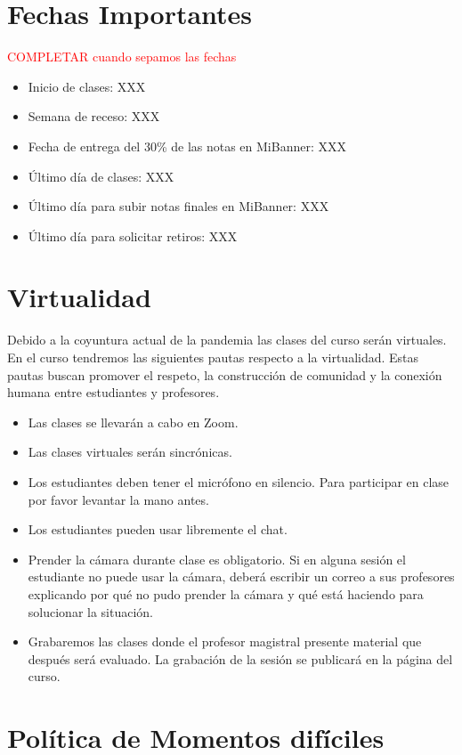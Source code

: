 \documentclass[11pt]{article}
\begin{document}
\section{Fechas Importantes}
\textcolor{red}{COMPLETAR cuando sepamos las fechas}
\begin{itemize}
\item Inicio de clases: XXX
\item Semana de receso: XXX
\item  Fecha de entrega del 30\% de las notas en MiBanner: XXX
\item Último día de clases: XXX
\item Último día para subir notas finales en MiBanner: XXX
\item Último día para solicitar retiros: XXX

\end{itemize}


\section{Virtualidad} \label{sec:virtualidad}

Debido a la coyuntura actual de la pandemia las clases del curso serán virtuales. En el curso tendremos las siguientes pautas respecto a la virtualidad. Estas pautas buscan promover el respeto, la construcción de comunidad y la conexión humana entre estudiantes y profesores.

\begin{itemize}
\item Las clases se llevarán a cabo en Zoom.
\item Las clases virtuales serán sincrónicas.
\item Los estudiantes deben tener el micrófono en silencio. Para participar en clase por favor levantar la mano antes.
\item Los estudiantes pueden usar libremente el chat.
\item Prender la cámara durante clase es obligatorio. Si en alguna sesión el estudiante no puede usar la cámara, deberá escribir un correo a sus profesores explicando por qué no pudo prender la cámara y qué está haciendo para solucionar la situación.
\item Grabaremos las clases donde el profesor magistral presente material que después será evaluado. La grabación de la sesión se publicará en la página del curso.
\end{itemize}

\section{Política de Momentos difíciles}
\end{document}
